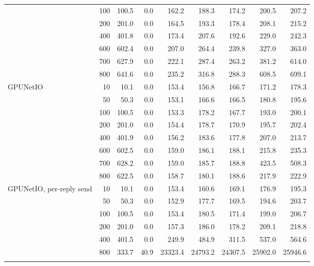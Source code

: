 \begin{tabular}{lrrrrrrrr}
 & 100 & 100.5 & 0.0 & 162.2 & 188.3 & 174.2 & 200.5 & 207.2 \\
 & 200 & 201.0 & 0.0 & 164.5 & 193.3 & 178.4 & 208.1 & 215.2 \\
 & 400 & 401.8 & 0.0 & 173.4 & 207.6 & 192.6 & 229.0 & 242.3 \\
 & 600 & 602.4 & 0.0 & 207.0 & 264.4 & 239.8 & 327.0 & 363.0 \\
 & 700 & 627.9 & 0.0 & 222.1 & 287.4 & 263.2 & 381.2 & 614.0 \\
 & 800 & 641.6 & 0.0 & 235.2 & 316.8 & 288.3 & 608.5 & 699.1 \\
\addlinespace
GPUNetIO & 10 & 10.1 & 0.0 & 153.4 & 156.8 & 166.7 & 171.2 & 178.3 \\
 & 50 & 50.3 & 0.0 & 153.1 & 166.6 & 166.5 & 180.8 & 195.6 \\
 & 100 & 100.5 & 0.0 & 153.3 & 178.2 & 167.7 & 193.0 & 200.1 \\
 & 200 & 201.0 & 0.0 & 154.4 & 178.7 & 170.9 & 195.7 & 202.4 \\
 & 400 & 401.9 & 0.0 & 156.2 & 183.6 & 177.8 & 207.0 & 213.7 \\
 & 600 & 602.5 & 0.0 & 159.0 & 186.1 & 188.1 & 215.8 & 235.3 \\
 & 700 & 628.2 & 0.0 & 159.0 & 185.7 & 188.8 & 423.5 & 508.3 \\
 & 800 & 622.5 & 0.0 & 158.7 & 180.1 & 188.6 & 217.9 & 222.9 \\
\addlinespace
GPUNetIO, per-reply send & 10 & 10.1 & 0.0 & 153.4 & 160.6 & 169.1 & 176.9 & 195.3 \\
 & 50 & 50.3 & 0.0 & 152.9 & 177.7 & 169.5 & 194.6 & 203.7 \\
 & 100 & 100.5 & 0.0 & 153.4 & 180.5 & 171.4 & 199.0 & 206.7 \\
 & 200 & 201.0 & 0.0 & 157.3 & 186.0 & 178.2 & 209.1 & 218.8 \\
 & 400 & 401.5 & 0.0 & 249.9 & 484.9 & 311.5 & 537.0 & 564.6 \\
 & 800 & 333.7 & 40.9 & 23323.4 & 24793.2 & 24307.5 & 25902.0 & 25946.6 \\
\addlinespace
\bottomrule\end{tabular}
